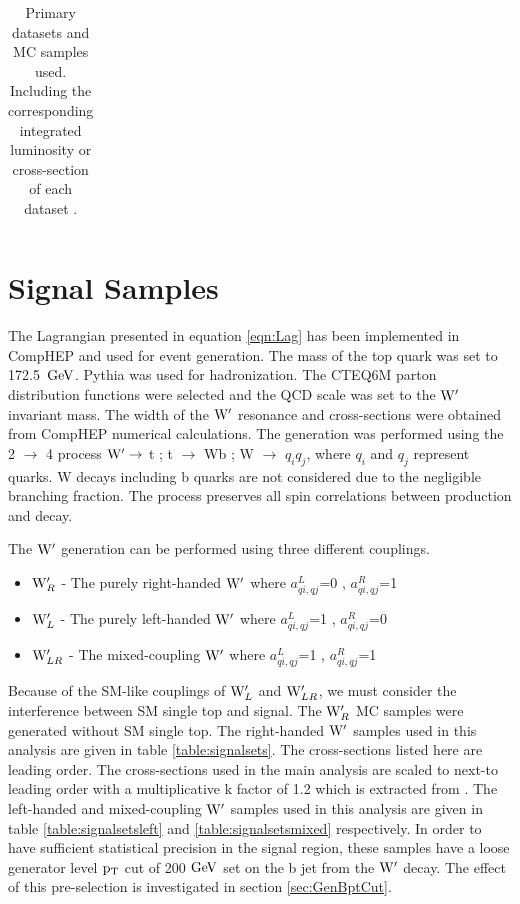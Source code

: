 \begin{table}
\begin{center}
\begin{tabular}{|p{0.7\linewidth}|c|}
\end{tabular}
\end{center}
\caption{Primary datasets and MC samples used. Including the corresponding integrated luminosity or cross-section of each dataset \cite{Czakon:2013goa,Kidonakis:2012db}.}
\label{table:datasets}
\end{table}

\section{Signal Samples}
\label{sec:signal}
The Lagrangian presented in equation \ref{eqn:Lag} has been implemented in CompHEP \cite{CompHEP} and used for event generation.  The mass of the top 
quark was set to 172.5~$\mathrm{GeV}$.  
Pythia was used for hadronization. The CTEQ6M parton distribution functions were selected and the QCD scale was set to the $\mathrm{W}^\prime$ invariant mass.  The width of 
the $\mathrm{W}^\prime$ resonance and cross-sections were obtained from CompHEP numerical calculations.  The generation was performed using the 2 $\rightarrow$ 4 
process $\mathrm{W}^\prime \rightarrow$ t ; t $\rightarrow$ Wb ; W $\rightarrow$ $q_{i}q_{j}$, where $q_{i}$ and $q_{j}$ represent quarks.  
W decays including b quarks are not considered due to the negligible branching fraction.  The process 
preserves all spin correlations between production and decay.

The $\mathrm{W}^\prime$ generation can be performed using three different couplings. 
\begin{itemize}
\item {\bf $\mathrm{W}^\prime_{R}$} - The purely right-handed $\mathrm{W}^\prime$ where $a_{qi,qj}^{L}$=0 , $a_{qi,qj}^{R}$=1 
\item {\bf $\mathrm{W}^\prime_{L}$} - The purely left-handed $\mathrm{W}^\prime$ where $a_{qi,qj}^{L}$=1 , $a_{qi,qj}^{R}$=0 
\item {\bf $\mathrm{W}^\prime_{LR}$} - The mixed-coupling $\mathrm{W}^\prime$ where $a_{qi,qj}^{L}$=1 , $a_{qi,qj}^{R}$=1 
\end{itemize}

Because of the SM-like couplings of $\mathrm{W}^\prime_{L}$ and $\mathrm{W}^\prime_{LR}$, we must consider the 
interference between SM single top and signal.  The $\mathrm{W}^\prime_{R}$ MC samples were generated without SM single top.  The right-handed $\mathrm{W}^\prime$ samples used in this analysis are given in table
\ref{table:signalsets}.  The cross-sections listed here are leading order.  The cross-sections 
used in the main analysis are scaled to next-to leading order with a multiplicative k factor of 1.2
which is extracted from \cite{kfactor}.  The left-handed and mixed-coupling $\mathrm{W}^\prime$ samples used 
in this analysis are given in table \ref{table:signalsetsleft} and \ref{table:signalsetsmixed} respectively.
In order to have sufficient statistical precision in the signal region, these samples have a loose generator 
level $\mathrm{p_{T}}$ cut of 200$~\mathrm{GeV}$ set on the b jet from the $\mathrm{W}^\prime$ decay.  The effect of this pre-selection is investigated in section \ref{sec:GenBptCut}.

